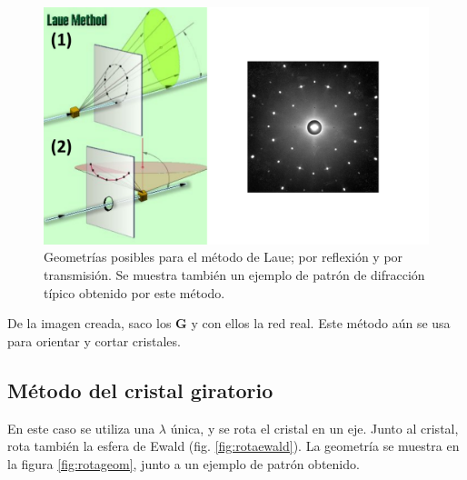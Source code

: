 \begin{figure}
  \centering
  \includegraphics[width=\textwidth]{figures/lauegeom.png}
  \caption{Geometrías posibles para el método de Laue; por reflexión y por
    transmisión. Se muestra también un ejemplo de patrón de difracción típico
    obtenido por este método.}
  \label{fig:lauegeom}
\end{figure}

De la imagen creada, saco los $\mathbf{G}$ y con ellos la red real. Este método
aún se usa para orientar y cortar cristales. 

\subsection{Método del cristal giratorio}
En este caso se utiliza una $\lambda$ única, y se rota el cristal en un eje.
Junto al cristal, rota también la esfera de Ewald (fig. \ref{fig:rotaewald}). La
geometría se muestra en la figura \ref{fig:rotageom}, junto a un ejemplo de
patrón obtenido.

